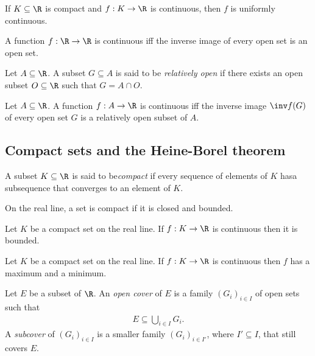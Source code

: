 \documentclass{article}
\begin{document}
\begin{proposition}[2.23]
	If $K\subseteq\R$ is compact and $f:K\to\R$ is continuous, then $f$ is
	uniformly continuous.
\end{proposition}

\begin{proposition}[2.24]
	A function $f:\R\to\R$ is continuous iff the inverse image of every
	open set is an open set.
\end{proposition}

\begin{definition}
	Let $A\subseteq\R$. A subset $G\subseteq A$ is said to be \emph{relatively open}
	if there exists an open subset $O\subseteq\R$ such that $G=A\cap O$.
\end{definition}

\begin{theorem}
	Let $A\subseteq\R$. A function $f:A\to\R$ is continuous iff the inverse
	image $\inv f(G)$ of every open set $G$ is a relatively open subset of $A$.
\end{theorem}

\subsection{Compact sets and the Heine-Borel theorem}

\begin{definition}
	A subset $K\subseteq\R$ is said to be\emph{compact} if every sequence of elements
	of $K$ hasa subsequence that converges to an element of $K$.
\end{definition}

\begin{theorem}[2.15]
	On the real line, a set is compact if it is closed and bounded.
\end{theorem}

\begin{theorem}[2.17]
	Let $K$ be a compact set on the real line. If $f:K\to\R$ is continuous
	then it is bounded.
\end{theorem}

\begin{theorem}
	Let $K$ be a compact set on the real line. If $f:K\to\R$ is continuous
	then $f$ has a maximum and a minimum.
\end{theorem}

\begin{definition}
	Let $E$ be a subset of $\R$. An \emph{open cover} of $E$ is a family
	$(G_i)_{i\in I}$ of open sets such that
	\begin{align*}
		E\subseteq \bigcup_{i\in I}G_i.
	\end{align*}
	A \emph{subcover} of $(G_i)_{i\in I}$ is a smaller family $(G_i)_{i\in I'}$,
	where $I'\subseteq I$, that still covers $E$.
\end{definition}
\end{document}

